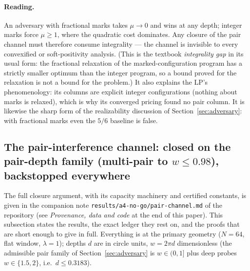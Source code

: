 \documentclass[11pt]{article}
\theoremstyle{plain}
\theoremstyle{definition}
\theoremstyle{remark}
\begin{document}
\paragraph{Reading.}
An adversary with fractional marks takes $\mu \to 0$ and wins at any depth;
integer marks force $\mu \ge 1$, where the quadratic cost dominates. Any closure
of the pair channel must therefore consume integrality --- the channel is
invisible to every convexified or soft-positivity analysis. (This is the textbook
\emph{integrality gap} in its usual form: the fractional relaxation of the
marked-configuration program has a strictly smaller optimum than the integer
program, so a bound proved for the relaxation is not a bound for the problem.)
It also explains the LP's phenomenology: its columns are explicit integer
configurations (nothing about marks is relaxed), which is why its converged
pricing found no pair column. It is likewise the sharp form of the realizability
discussion of Section~\ref{sec:adversary}: with fractional marks even the $5/6$
baseline is false.

\subsection[The pair-interference channel: closed on the pair-depth family
(multi-pair to w <= 0.98), backstopped everywhere]{The pair-interference channel:
closed on the pair-depth family (multi-pair to $w \le 0.98$), backstopped
everywhere}
\label{sec:pairchannel}

The full closure argument, with its capacity machinery and certified constants,
is given in the companion note
\texttt{results/a4-no-go/}\allowbreak\texttt{pair-}\allowbreak\texttt{channel.md}
of the repository (see \emph{Provenance, data and code} at the end of this
paper). This subsection states the results, the exact ledger they rest on, and
the proofs that are short enough to give in full. Everything is at the
primary geometry ($N = 64$, flat window, $\lambda = 1$); depths $d$ are in
circle units, $w = 2\pi d$ dimensionless (the admissible pair family of
Section~\ref{sec:adversary} is
$w \in (0, 1]$ plus deep probes $w \in \{1.5, 2\}$, i.e.\ $d \le 0.3183$).
\end{document}
